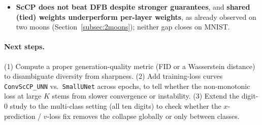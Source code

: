 \begin{itemize}
          directly on the codes (\texttt{LatentScCP\_UNN}), and the AE decodes
          only for visualisation. This consistently produced \emph{blurrier}
          digits than the pixel-space model and, more tellingly, the ScCP
          iterations \emph{converged poorly}. The likely cause is that the
          analytical $\ell_1$ dual prox is no longer an appropriate prior in the
          latent domain: sparsity is a sensible regulariser on a
          (convolutional/wavelet) pixel representation, but the AE latent codes
          are dense, entangled features for which $\ell_1$ clipping is not a
          meaningful proximal step, so the unrolled solver loses the variational
          structure it relies on. All reported experiments are therefore in pixel
          space.
    \item \textbf{ScCP does not beat DFB despite stronger guarantees}, and
          \textbf{shared (tied) weights underperform per-layer weights}, as
          already observed on two moons (Section~\ref{subsec:2moons}); neither
          gap closes on MNIST.
\end{itemize}

\paragraph{Next steps.} (1) Compute a proper generation-quality metric (FID or a
Wasserstein distance) to disambiguate diversity from sharpness. (2) Add training-loss
curves \texttt{ConvScCP\_UNN} vs.\ \texttt{SmallUNet} across epochs, to tell
whether the non-monotonic loss at large $K$ stems from slower convergence or
instability. (3) Extend the digit-$0$ study to the multi-class setting (all ten
digits) to check whether the $x$-prediction / $v$-loss fix removes the collapse
globally or only between classes.
